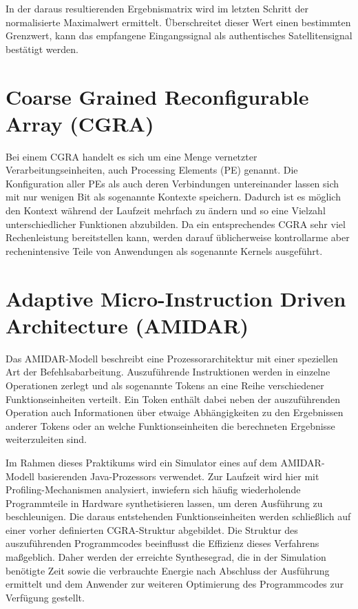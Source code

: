 \documentclass[parskip,
							 oneside,
							 11pt,
							 noheadingspace,
							 accentcolor=tud1d,
							 bigchapter,
							 colorback]{tudreport}
\begin{document}
In der daraus resultierenden Ergebnismatrix wird im letzten Schritt der normalisierte Maximalwert ermittelt. Überschreitet dieser Wert einen bestimmten Grenzwert, kann das empfangene Eingangssignal als authentisches Satellitensignal bestätigt werden.

\section{Coarse Grained Reconfigurable Array (CGRA)}
Bei einem CGRA handelt es sich um eine Menge vernetzter Verarbeitungseinheiten, auch Processing Elements (PE) genannt. Die Konfiguration aller PEs als auch deren Verbindungen untereinander lassen sich mit nur wenigen Bit als sogenannte Kontexte speichern. Dadurch ist es möglich den Kontext während der Laufzeit mehrfach zu ändern und so eine Vielzahl unterschiedlicher Funktionen abzubilden. Da ein entsprechendes CGRA sehr viel Rechenleistung bereitstellen kann, werden darauf üblicherweise kontrollarme aber rechenintensive Teile von Anwendungen als sogenannte Kernels ausgeführt.  

\section{Adaptive Micro-Instruction Driven Architecture (AMIDAR)}
Das AMIDAR-Modell beschreibt eine Prozessorarchitektur mit einer speziellen Art der Befehlsabarbeitung. Auszuführende Instruktionen werden in einzelne Operationen zerlegt und als sogenannte Tokens an eine Reihe verschiedener Funktionseinheiten verteilt. Ein Token enthält dabei neben der auszuführenden Operation auch Informationen über etwaige Abhängigkeiten zu den Ergebnissen anderer Tokens oder an welche Funktionseinheiten die berechneten Ergebnisse weiterzuleiten sind. 

Im Rahmen dieses Praktikums wird ein Simulator eines auf dem AMIDAR-Modell basierenden Java-Prozessors verwendet. Zur Laufzeit wird hier mit Profiling-Mechanismen analysiert, inwiefern sich häufig wiederholende Programmteile in Hardware synthetisieren lassen, um deren Ausführung zu beschleunigen. Die daraus entstehenden Funktionseinheiten werden schließlich auf einer vorher definierten CGRA-Struktur abgebildet. Die Struktur des auszuführenden Programmcodes beeinflusst die Effizienz dieses Verfahrens maßgeblich. Daher werden der erreichte Synthesegrad, die in der Simulation benötigte Zeit sowie die verbrauchte Energie nach Abschluss der Ausführung ermittelt und dem Anwender zur weiteren Optimierung des Programmcodes zur Verfügung gestellt.
\end{document}
